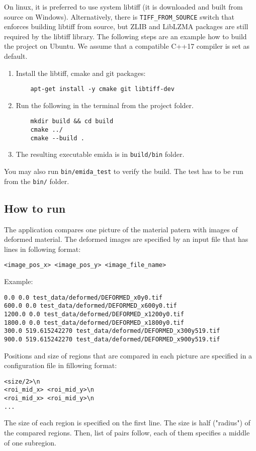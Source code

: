 On linux, it is preferred to use system libtiff (it is downloaded and built from source on Windows). Alternatively, there is \texttt{TIFF\_FROM\_SOURCE} switch that enforces building libtiff from source, but ZLIB and LibLZMA packages are still required by the libtiff library. The following steps are an example how to build the project on Ubuntu. We assume that a compatible C++17 compiler is set as default.
\begin{enumerate}
	\item Install the libtiff, cmake and git packages: 
	\begin{verbatim}
	apt-get install -y cmake git libtiff-dev
	\end{verbatim}
	\item Run the following in the terminal from the project folder.
	\begin{verbatim}
	mkdir build && cd build
	cmake ../
	cmake --build .
	\end{verbatim}
	\item The resulting executable emida is in \texttt{build/bin} folder.
\end{enumerate}
You may also run \texttt{bin/emida\_test} to verify the build.  The test has to be run from the \texttt{bin/} folder.

\subsection*{How to run}

The application compares one picture of the material patern with images of deformed material. The deformed images are specified by an input file that has lines in following format:
\begin{verbatim}
<image_pos_x> <image_pos_y> <image_file_name>
\end{verbatim}
Example:
\begin{verbatim}
0.0 0.0 test_data/deformed/DEFORMED_x0y0.tif
600.0 0.0 test_data/deformed/DEFORMED_x600y0.tif
1200.0 0.0 test_data/deformed/DEFORMED_x1200y0.tif
1800.0 0.0 test_data/deformed/DEFORMED_x1800y0.tif
300.0 519.615242270 test_data/deformed/DEFORMED_x300y519.tif
900.0 519.615242270 test_data/deformed/DEFORMED_x900y519.tif
\end{verbatim}
Positions and size of regions that are compared in each picture are specified in a configuration file in fillowing format:
\begin{verbatim}
<size/2>\n
<roi_mid_x> <roi_mid_y>\n
<roi_mid_x> <roi_mid_y>\n
...
\end{verbatim}
The size of each region is specified on the first line. The size is half ("radius") of the compared regions. Then, list of pairs follow, each of them specifies a middle of one subregion.

